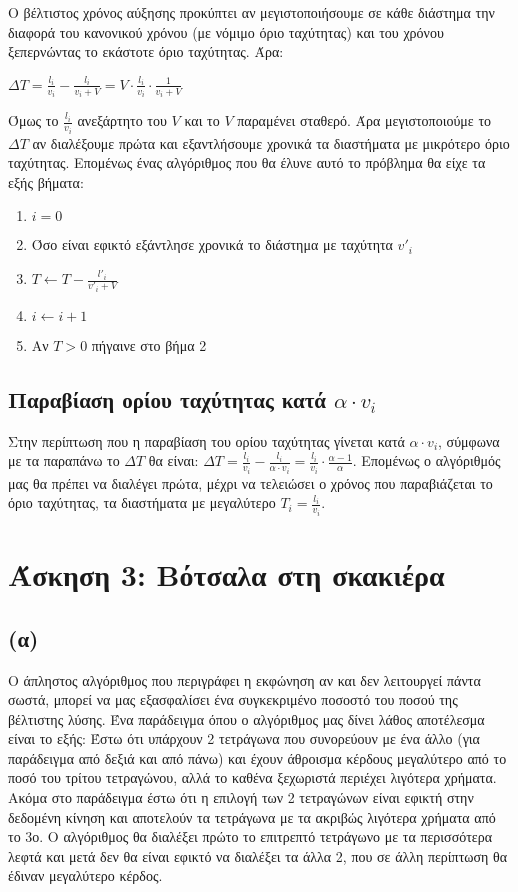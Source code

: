 \documentclass[a4paper,12pt]{report}
\begin{document}
Ο βέλτιστος χρόνος αύξησης προκύπτει αν μεγιστοποιήσουμε σε κάθε διάστημα την διαφορά του κανονικού χρόνου (με νόμιμο όριο ταχύτητας) και του χρόνου ξεπερνώντας το εκάστοτε όριο ταχύτητας. Άρα:
\begin{center}
$\Delta T = \frac{l_i}{v_i} - \frac{l_i}{v_i+V} = V \cdot \frac{l_i}{v_i} \cdot \frac{1}{v_i+V}$
\end{center}
Όμως το $\frac{l_i}{v_i}$ ανεξάρτητο του $V$ και το $V$ παραμένει σταθερό. Άρα μεγιστοποιούμε το $\Delta T$ αν διαλέξουμε πρώτα και εξαντλήσουμε χρονικά τα διαστήματα με μικρότερο όριο ταχύτητας. Επομένως ένας αλγόριθμος που θα έλυνε αυτό το πρόβλημα θα είχε τα εξής βήματα:
\begin{enumerate}
 \item $i=0$
 \item Όσο είναι εφικτό εξάντλησε χρονικά το διάστημα με ταχύτητα $v'_i$
 \item $T \gets T-\frac{l'_i}{v'_i+V}$
 \item $i \gets i+1$
 \item Αν $T>0$ πήγαινε στο βήμα 2
\end{enumerate}

\subsection*{Παραβίαση ορίου ταχύτητας κατά $\alpha \cdot v_i$}
Στην περίπτωση που η παραβίαση του ορίου ταχύτητας γίνεται κατά $\alpha \cdot v_i$, σύμφωνα με τα παραπάνω το $\Delta T$ θα είναι: $\Delta T = \frac{l_i}{v_i} - \frac{l_i}{\alpha \cdot v_i} = \frac{l_i}{v_i} \cdot \frac{\alpha-1}{\alpha}$. Επομένως ο αλγόριθμός μας θα πρέπει να διαλέγει πρώτα, μέχρι να τελειώσει ο χρόνος που παραβιάζεται το όριο ταχύτητας, τα διαστήματα με μεγαλύτερο $T_i=\frac{l_i}{v_i}$.     

\section*{Άσκηση 3: Βότσαλα στη σκακιέρα}
\subsection*{(α)}
Ο άπληστος αλγόριθμος που περιγράφει η εκφώνηση αν και δεν λειτουργεί πάντα σωστά, μπορεί να μας εξασφαλίσει ένα συγκεκριμένο ποσοστό του ποσού της βέλτιστης λύσης. Ένα παράδειγμα όπου ο αλγόριθμος μας δίνει λάθος αποτέλεσμα είναι το εξής: Έστω ότι υπάρχουν 2 τετράγωνα που συνορεύουν με ένα άλλο (για παράδειγμα από δεξιά και από πάνω) και έχουν άθροισμα κέρδους μεγαλύτερο από το ποσό του τρίτου τετραγώνου, αλλά το καθένα ξεχωριστά περιέχει λιγότερα χρήματα. Ακόμα στο παράδειγμα έστω ότι η επιλογή των 2 τετραγώνων είναι εφικτή στην δεδομένη κίνηση και αποτελούν τα τετράγωνα με τα ακριβώς λιγότερα χρήματα από το 3ο. Ο αλγόριθμος θα διαλέξει πρώτο το επιτρεπτό τετράγωνο με τα περισσότερα λεφτά και μετά δεν θα είναι εφικτό να διαλέξει τα άλλα 2, που σε άλλη περίπτωση θα έδιναν μεγαλύτερο κέρδος. 
\end{document}
